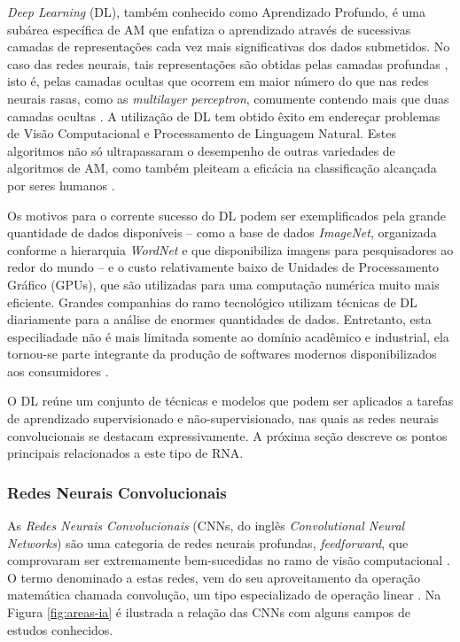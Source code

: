 
\emph{Deep Learning} (DL), também conhecido como Aprendizado Profundo, é uma subárea específica de AM que enfatiza o aprendizado através de sucessivas camadas de representações cada vez mais significativas dos dados submetidos. No caso das redes neurais, tais representações são obtidas pelas camadas profundas \cite{chollet}, isto é, pelas camadas ocultas que ocorrem em maior número do que nas redes neurais rasas, como as \emph{multilayer perceptron}, comumente contendo mais que duas camadas ocultas \cite{heaton}. A utilização de DL tem obtido êxito em endereçar problemas de Visão Computacional e Processamento de Linguagem Natural. Estes algoritmos não só ultrapassaram o desempenho de outras variedades de algoritmos de AM, como também pleiteam a eficácia na classificação alcançada por seres humanos \cite{buduma}.

Os motivos para o corrente sucesso do DL podem ser exemplificados pela grande quantidade de dados disponíveis -- como a base de dados \emph{ImageNet}, organizada conforme a hierarquia \emph{WordNet} e que disponibiliza imagens para pesquisadores ao redor do mundo \cite{imagenet} -- e o custo relativamente baixo de Unidades de Processamento Gráfico (GPUs), que são utilizadas para uma computação numérica muito mais eficiente. Grandes companhias do ramo tecnológico utilizam técnicas de DL diariamente para a análise de enormes quantidades de dados. Entretanto, esta especiliadade não é mais limitada somente ao domínio acadêmico e industrial, ela tornou-se parte integrante da produção de softwares modernos disponibilizados aos consumidores \cite{gulli}.

O DL reúne um conjunto de técnicas e modelos que podem ser aplicados a tarefas de aprendizado supervisionado e não-supervisionado, nas quais as redes neurais convolucionais se destacam expressivamente. A próxima seção descreve os pontos principais relacionados a este tipo de RNA.

\subsubsection{Redes Neurais Convolucionais}
\label{subsubsec:cnns}

As \emph{Redes Neurais Convolucionais} (CNNs, do inglês \emph{Convolutional Neural Networks}) são uma categoria de redes neurais profundas, \emph{feedforward}, que comprovaram ser extremamente bem-sucedidas no ramo de visão computacional \cite{khan}. O termo denominado a estas redes, vem do seu aproveitamento da operação matemática chamada convolução, um tipo especializado de operação linear \cite{goodfellow}. Na Figura \ref{fig:areas-ia} é ilustrada a relação das CNNs com alguns campos de estudos conhecidos.

